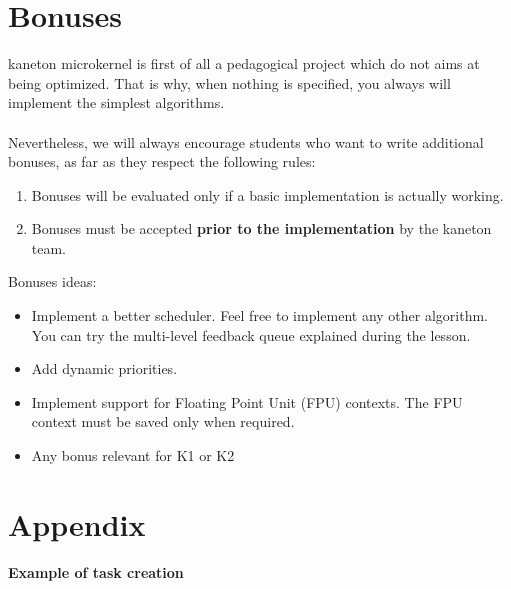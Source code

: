 %
%

\newpage

\section{Bonuses}

kaneton microkernel is first of all a pedagogical project which do not
aims at being optimized. That is why, when nothing is specified, you
always will implement the simplest algorithms.\\
\\
Nevertheless, we will always encourage students who want to write
additional bonuses, as far as they respect the following rules:

\begin{enumerate}
\item Bonuses will be evaluated only if a basic implementation is
  actually working.
\item Bonuses must be accepted \textbf{prior to the implementation}
  by the kaneton team.
\end{enumerate}

Bonuses ideas:
\begin{itemize}
\item
  Implement a better scheduler. Feel free to implement any other
  algorithm. You can try the multi-level feedback queue explained
  during the lesson.

\item
  Add dynamic priorities.

\item
  Implement support for Floating Point Unit (FPU) contexts. The FPU
  context must be saved only when required.

\item
  Any bonus relevant for K1 or K2
\end{itemize}

%
%

\newpage

\section{Appendix}

\textbf{Example of task creation}

